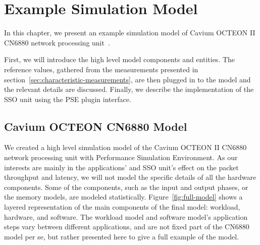 \chapter{Example Simulation Model}
\label{chapter:example-simulation-model}

In this chapter, we present an example simulation model of Cavium OCTEON II CN6880 network processing unit~\cite{cavium:2010:fundamentals}.

First, we will introduce the high level model components and entities. The reference values, gathered from the measurements presented in section~\ref{sec:characteristic-measurements}, are then plugged in to the model and the relevant details are discussed. Finally, we describe the implementation of the SSO unit using the PSE plugin interface.

\section{Cavium OCTEON CN6880 Model}
\label{sec:simulation-model}
We created a high level simulation model of the Cavium OCTEON II CN6880 network processing unit with Performance Simulation Environment. As our interests are mainly in the applications' and SSO unit's  effect on the packet throughput and latency, we will not model the specific details of all the hardware components. Some of the components, such as the input and output phases, or the memory models, are modeled statistically. Figure~\ref{fig:full-model} shows a layered representation of the main components of the final model: workload, hardware, and software. The workload model and software model's application steps vary between different applications, and are not fixed part of the CN6880 model per se, but rather presented here to give a full example of the model.

